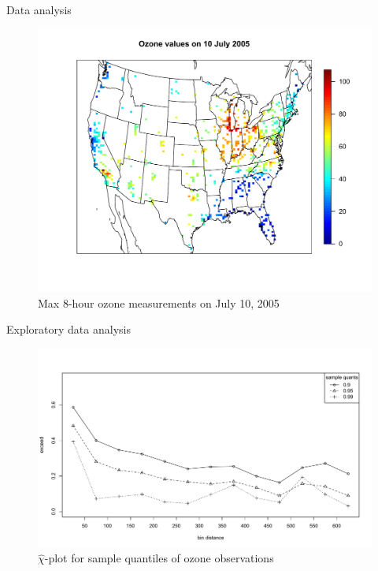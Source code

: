 \documentclass{beamer}
\begin{document}
\begin{frame}{Data analysis}
  \centering
  \begin{figure}
    \includegraphics[width=1\linewidth]{./plots/pot/ozone-10jul-us.pdf}
    \caption{Max 8-hour ozone measurements on July 10, 2005}
   \end{figure}

\end{frame}

\begin{frame}{Exploratory data analysis}
	\centering
  \begin{figure}
    \includegraphics[width=1\linewidth]{./plots/pot/chi-plot-ozone-res.pdf}
    \caption{$\widehat{\chi}$-plot for sample quantiles of ozone observations}
  \end{figure}
\end{frame}
\end{document}
